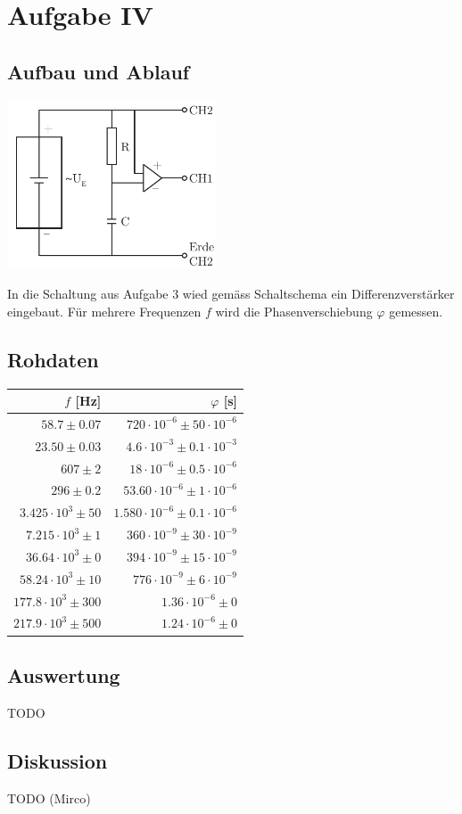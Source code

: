\documentclass[12pt,a4paper]{article}
\begin{document}
\section*{Aufgabe IV}
\subsection*{Aufbau und Ablauf}
\includegraphics[height=5cm]{illustration4.pdf}

\noindent
In die Schaltung aus Aufgabe 3 wied gem\"ass Schaltschema ein Differenzverst\"arker eingebaut. F\"ur mehrere Frequenzen $f$ wird die Phasenverschiebung $\varphi$ gemessen.

\subsection*{Rohdaten}
\begin{tabular}{|r|r|}
\hline
$f$ [Hz]&$\varphi$ [s]\\
\hline
$58.7 \pm 0.07$&$720\cdot 10^{-6} \pm 50\cdot 10^{-6}$\\
$23.50 \pm 0.03$&$4.6\cdot 10^{-3} \pm 0.1\cdot 10^{-3}$\\
$607 \pm 2$&$18\cdot 10^{-6} \pm 0.5\cdot 10^{-6}$\\
$296 \pm 0.2$&$53.60\cdot 10^{-6} \pm 1\cdot 10^{-6}$\\
$3.425\cdot 10^{3} \pm 50$&$1.580\cdot 10^{-6} \pm 0.1\cdot 10^{-6}$\\
$7.215\cdot 10^{3} \pm 1$&$360\cdot 10^{-9} \pm 30\cdot 10^{-9}$\\
$36.64\cdot 10^{3} \pm 0$&$394\cdot 10^{-9} \pm 15\cdot 10^{-9}$\\
$58.24\cdot 10^{3} \pm 10$&$776\cdot 10^{-9} \pm 6\cdot 10^{-9}$\\
$177.8\cdot 10^{3} \pm 300$&$1.36\cdot 10^{-6} \pm 0$\\
$217.9\cdot 10^{3} \pm 500$&$1.24\cdot 10^{-6} \pm 0$\\
\hline
\end{tabular}

\subsection*{Auswertung}
TODO

\subsection*{Diskussion}
TODO (Mirco)
\end{document}
